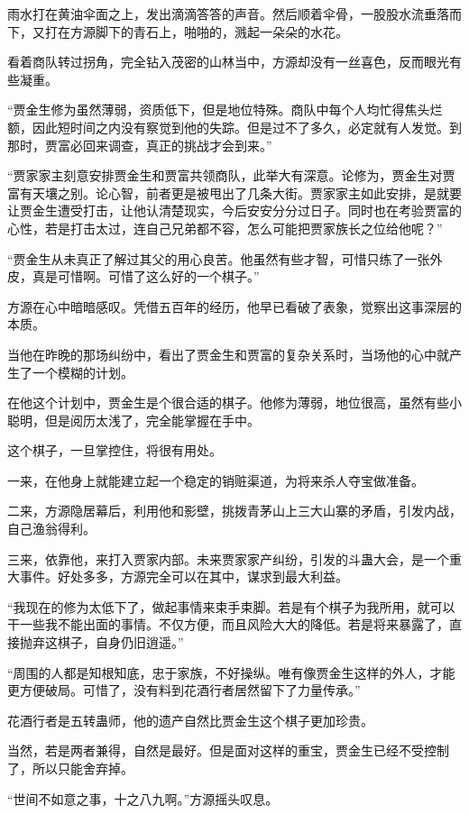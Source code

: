\begin{this_body}
雨水打在黄油伞面之上，发出滴滴答答的声音。然后顺着伞骨，一股股水流垂落而下，又打在方源脚下的青石上，啪啪的，溅起一朵朵的水花。

看着商队转过拐角，完全钻入茂密的山林当中，方源却没有一丝喜色，反而眼光有些凝重。

“贾金生修为虽然薄弱，资质低下，但是地位特殊。商队中每个人均忙得焦头烂额，因此短时间之内没有察觉到他的失踪。但是过不了多久，必定就有人发觉。到那时，贾富必回来调查，真正的挑战才会到来。”

“贾家家主刻意安排贾金生和贾富共领商队，此举大有深意。论修为，贾金生对贾富有天壤之别。论心智，前者更是被甩出了几条大街。贾家家主如此安排，是就要让贾金生遭受打击，让他认清楚现实，今后安安分分过日子。同时也在考验贾富的心性，若是打击太过，连自己兄弟都不容，怎么可能把贾家族长之位给他呢？”

“贾金生从未真正了解过其父的用心良苦。他虽然有些才智，可惜只练了一张外皮，真是可惜啊。可惜了这么好的一个棋子。”

方源在心中暗暗感叹。凭借五百年的经历，他早已看破了表象，觉察出这事深层的本质。

当他在昨晚的那场纠纷中，看出了贾金生和贾富的复杂关系时，当场他的心中就产生了一个模糊的计划。

在他这个计划中，贾金生是个很合适的棋子。他修为薄弱，地位很高，虽然有些小聪明，但是阅历太浅了，完全能掌握在手中。

这个棋子，一旦掌控住，将很有用处。

一来，在他身上就能建立起一个稳定的销赃渠道，为将来杀人夺宝做准备。

二来，方源隐居幕后，利用他和影壁，挑拨青茅山上三大山寨的矛盾，引发内战，自己渔翁得利。

三来，依靠他，来打入贾家内部。未来贾家家产纠纷，引发的斗蛊大会，是一个重大事件。好处多多，方源完全可以在其中，谋求到最大利益。

“我现在的修为太低下了，做起事情来束手束脚。若是有个棋子为我所用，就可以干一些我不能出面的事情。不仅方便，而且风险大大的降低。若是将来暴露了，直接抛弃这棋子，自身仍旧逍遥。”

“周围的人都是知根知底，忠于家族，不好操纵。唯有像贾金生这样的外人，才能更方便破局。可惜了，没有料到花酒行者居然留下了力量传承。”

花酒行者是五转蛊师，他的遗产自然比贾金生这个棋子更加珍贵。

当然，若是两者兼得，自然是最好。但是面对这样的重宝，贾金生已经不受控制了，所以只能舍弃掉。

“世间不如意之事，十之八九啊。”方源摇头叹息。


\end{this_body}
